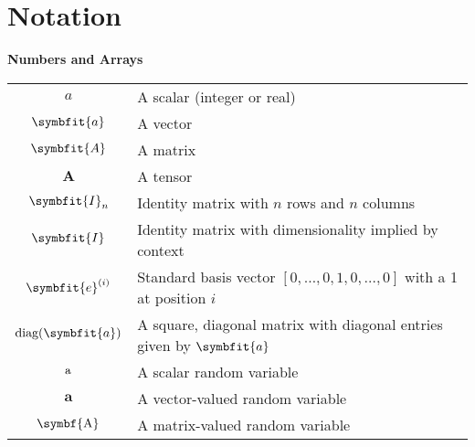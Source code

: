 \chapter*{Notation}\label{notation}


\newcommand{\mA}{\symbfit{A}}
\newcommand{\mB}{\symbfit{B}}
\def\mI{\symbfit{I}}
\def\va{{\symbfit{a}}}
\def\ve{{\symbfit{e}}}

\def\ra{{\textnormal{a}}}
\def\rva{{\symbf{a}}}
\def\rmA{\symbf{\textnormal{A}}}
\newcommand{\tens}[1]{\symbfit{\mathsfit{#1}}}
\def\tA{{\symbf{A}}}

\begin{minipage}{\textwidth}
\centerline{\bf Numbers and Arrays}
\bgroup
\def\arraystretch{1.5}
\begin{tabular}{cp{5in}}
$\displaystyle a$ & A scalar (integer or real)\\
$\displaystyle \va$ & A vector\\
$\displaystyle \mA$ & A matrix\\
$\displaystyle \tA$ & A tensor\\
$\displaystyle \mI_n$ & Identity matrix with $n$ rows and $n$ columns\\
$\displaystyle \mI$ & Identity matrix with dimensionality implied by context\\
$\displaystyle \ve^{(i)}$ & Standard basis vector $[0,\dots,0,1,0,\dots,0]$ with a 1 at position $i$\\
$\displaystyle \text{diag}(\va)$ & A square, diagonal matrix with diagonal entries given by $\va$\\
$\displaystyle \ra$ & A scalar random variable\\
$\displaystyle \rva$ & A vector-valued random variable\\
$\displaystyle \rmA$ & A matrix-valued random variable\\
\end{tabular}
\egroup
{}
\end{minipage}

